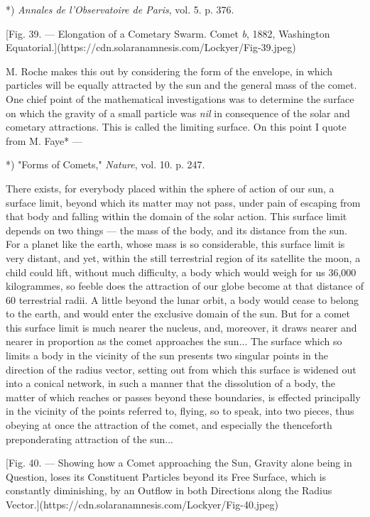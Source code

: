 \documentclass[a4paper, 12pt, oneside, polutonikogreek, english]{article}
\begin{document}
*) \emph{Annales de l'Observatoire de Paris}, vol. 5. p. 376.

[Fig. 39. --- Elongation of a Cometary Swarm. Comet \emph{b}, 1882, Washington Equatorial.](https://cdn.solaranamnesis.com/Lockyer/Fig-39.jpeg)

M. Roche makes this out by considering the form of the envelope, in which particles will be equally attracted by the sun and the general mass of the comet. One chief point of the mathematical investigations was to determine the surface on which the gravity of a small particle was \emph{nil} in consequence of the solar and cometary attractions. This is called the limiting surface. On this point I quote from M. Faye* ---

*) "Forms of Comets," \emph{Nature}, vol. 10. p. 247.

There exists, for everybody placed within the sphere of action of our sun, a surface limit, beyond which its matter may not pass, under pain of escaping from that body and falling within the domain of the solar action. This surface limit depends on two things --- the mass of the body, and its distance from the sun. For a planet like the earth, whose mass is so considerable, this surface limit is very distant, and yet, within the still terrestrial region of its satellite the moon, a child could lift, without much difficulty, a body which would weigh for us 36,000 kilogrammes, so feeble does the attraction of our globe become at that distance of 60 terrestrial radii. A little beyond the lunar orbit, a body would cease to belong to the earth, and would enter the exclusive domain of the sun. But for a comet this surface limit is much nearer the nucleus, and, moreover, it draws nearer and nearer in proportion as the comet approaches the sun... The surface which so limits a body in the vicinity of the sun presents two singular points in the direction of the radius vector, setting out from which this surface is widened out into a conical network, in such a manner that the dissolution of a body, the matter of which reaches or passes beyond these boundaries, is effected principally in the vicinity of the points referred to, flying, so to speak, into two pieces, thus obeying at once the attraction of the comet, and especially the thenceforth preponderating attraction of the sun...

[Fig. 40. --- Showing how a Comet approaching the Sun, Gravity alone being in Question, loses its Constituent Particles beyond its Free Surface, which is constantly diminishing, by an Outflow in both Directions along the Radius Vector.](https://cdn.solaranamnesis.com/Lockyer/Fig-40.jpeg)
\end{document}
